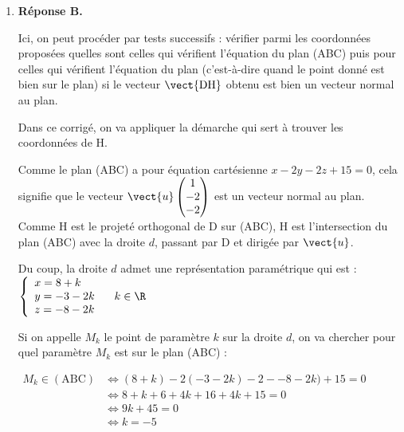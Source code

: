 \begin{enumerate}
Pour la proposition \textbf{d.}, aucunes des coordonnées des points B, C et D ne vérifient pas l'équation.

Par contre, pour l'équation de la proposition \textbf{c.}, on a :

$4 x_\mathrm{B}+y_\mathrm{B}+z_\mathrm{B}-21=4\times 3 + 6 + 3 - 21 = 12 + 9 - 21 =0$ donc B appartient à ce plan.

$4 x_\mathrm{C}+y_\mathrm{C}+z_\mathrm{C}-21=4\times 3 + 0 + 9 - 21 = 12 + 9 -21 =0$ donc C appartient à ce plan.

$4 x_\mathrm{D}+y_\mathrm{D}+z_\mathrm{D}-21=4\times 8 - 3 - 8 - 21 = 32 - 11 - 21 = 0$ donc D appartient à ce plan.

Ainsi, l'équation de la proposition \textbf{c.} décrit un plan qui contient les points B, C et D : c'est le plan (BCD).

	\item \textbf{Réponse B.}

Ici, on peut procéder par tests successifs : vérifier parmi les coordonnées proposées quelles sont celles qui vérifient l'équation du plan (ABC) puis pour celles qui vérifient l'équation du plan (c'est-à-dire quand le point donné est bien sur le plan) si le vecteur $\vect{\mathrm{DH}}$ obtenu est bien un vecteur normal au plan.

Dans ce corrigé, on va appliquer la démarche qui sert à trouver les coordonnées de H.

Comme le plan (ABC) a pour équation cartésienne $x-2 y-2 z+15=0$, cela signifie que le vecteur $\vect{u} \begin{pmatrix}1\\-2\\-2\end{pmatrix}$ est un vecteur normal au plan. Comme H est le projeté orthogonal de D sur (ABC), H est l'intersection du plan (ABC) avec la droite $d$, passant par D et dirigée par $\vect{u}$.

Du coup, la droite $d$ admet une représentation paramétrique qui est : $\left\{\begin{array}{l} x=8+k\\y=-3-2k\\z=-8-2k \end{array}\right. \quad k \in \R$

Si on appelle $M_k$ le point de paramètre $k$ sur la droite $d$, on va chercher pour quel paramètre $M_k$ est sur le plan (ABC) :

$\begin{aligned} M_k \in (\mathrm{ABC}) &\iff (8+k) -2(-3-2k) - 2--8-2k)+15=0\\
&\iff 8+k+6+4k+16+4k+15 = 0\\
&\iff 9k + 45 = 0\\
&\iff k = -5\\ \end{aligned}$


\end{enumerate}
